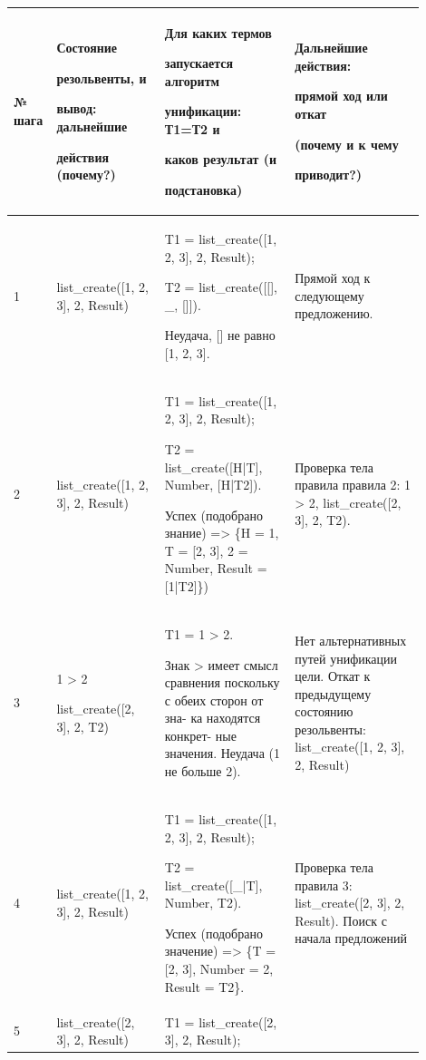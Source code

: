\documentclass[a4paper,12pt]{article}
\begin{document}
	\begin{center}
		\begin{longtable}[h!]{|p{0.05\linewidth}|p{0.25\linewidth}|p{ 0.3\linewidth}|p{ 0.3\linewidth}|}
			\hline
			{№ шага} & {Состояние 
				
				резольвенты, и 
				
				вывод: дальнейшие 
				
				действия (почему?)} & {Для каких термов 
				
				запускается алгоритм 
				
				унификации: Т1=Т2 и 
				
				каков {\bf результат} (и 
				
				подстановка)} & {Дальнейшие действия: 
				
				прямой ход или откат 
				
				(почему и к чему 
				
				приводит?)}\\
			\hline
			{1} & {list\_create([1, 2, 3], 2, Result)} & {T1 = list\_create([1, 2, 3], 2, Result);
			
		T2 = list\_create([[], \_, []]).
	
Неудача, [] не равно [1, 2, 3].} & {Прямой ход к следующему предложению.}\\
			\hline
			{2} & {list\_create([1, 2, 3], 2, Result)} & {T1 = list\_create([1, 2, 3], 2, Result);
			
		T2 = list\_create([H|T], Number, [H|T2]). 
		
		Успех (подобрано знание) => \{H = 1, T = [2, 3], 2 = Number, Result = [1|T2]\})} & {Проверка тела правила правила 2: 1 > 2, list\_create([2, 3], 2, T2).}\\
			\hline
			{3} & {1 > 2
			
		list\_create([2, 3], 2, T2)} & {T1 = 1 > 2.
	
Знак > имеет смысл сравнения поскольку с обеих сторон от зна- ка находятся конкрет- ные значения. Неудача (1 не больше 2).} & {Нет альтернативных путей унификации цели. Откат к предыдущему состоянию резольвенты: list\_create([1, 2, 3], 2, Result)}\\
			\hline
			{4} & {list\_create([1, 2, 3], 2, Result)} & {T1 = list\_create([1, 2, 3], 2, Result);
			
		T2 = list\_create([\_|T], Number, T2).
	
Успех (подобрано значение) => \{T = [2, 3], Number = 2, Result = T2\}.} & {Проверка тела правила 3: list\_create([2, 3], 2, Result). Поиск с начала предложений}\\
			\hline
			{5} & {list\_create([2, 3], 2, Result)} & {T1 = list\_create([2, 3], 2, Result);
			
}
\end{longtable}
\end{center}
\end{document}
